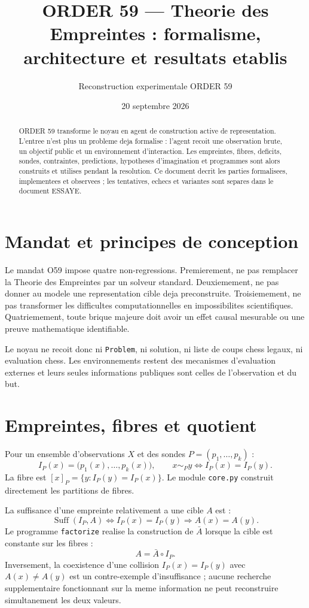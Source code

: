 \documentclass[11pt,a4paper]{article}
\title{ORDER 59 --- Theorie des Empreintes : formalisme, architecture et resultats etablis}
\author{Reconstruction experimentale ORDER 59}
\date{20 septembre 2026}
\begin{document}
\maketitle
\tableofcontents
\newpage

\begin{abstract}
ORDER 59 transforme le noyau en agent de construction active de representation. L'entree n'est plus un probleme deja formalise : l'agent recoit une observation brute, un objectif public et un environnement d'interaction. Les empreintes, fibres, deficits, sondes, contraintes, predictions, hypotheses d'imagination et programmes sont alors construits et utilises pendant la resolution. Ce document decrit les parties formalisees, implementees et observees ; les tentatives, echecs et variantes sont separes dans le document ESSAYE.
\end{abstract}

\section{Mandat et principes de conception}
Le mandat O59 impose quatre non-regressions. Premierement, ne pas remplacer la Theorie des Empreintes par un solveur standard. Deuxiemement, ne pas donner au modele une representation cible deja preconstruite. Troisiemement, ne pas transformer les difficultes computationnelles en impossibilites scientifiques. Quatriemement, toute brique majeure doit avoir un effet causal mesurable ou une preuve mathematique identifiable.

Le noyau ne recoit donc ni \texttt{Problem}, ni solution, ni liste de coups chess legaux, ni evaluation chess. Les environnements restent des mecanismes d'evaluation externes et leurs seules informations publiques sont celles de l'observation et du but.

\section{Empreintes, fibres et quotient}
Pour un ensemble d'observations $X$ et des sondes $P=(p_1,\ldots,p_k)$ :
\[
I_P(x)=\bigl(p_1(x),\ldots,p_k(x)\bigr),\qquad x\sim_P y\iff I_P(x)=I_P(y).
\]
La fibre est $[x]_P=\{y:I_P(y)=I_P(x)\}$. Le module \texttt{core.py} construit directement les partitions de fibres.

La suffisance d'une empreinte relativement a une cible $A$ est :
\[
\operatorname{Suff}(I_P,A)\Longleftrightarrow I_P(x)=I_P(y)\Rightarrow A(x)=A(y).
\]
Le programme \texttt{factorize} realise la construction de $\bar A$ lorsque la cible est constante sur les fibres :
\[
A=\bar A\circ I_P.
\]
Inversement, la coexistence d'une collision $I_P(x)=I_P(y)$ avec $A(x)\neq A(y)$ est un contre-exemple d'insuffisance ; aucune recherche supplementaire fonctionnant sur la meme information ne peut reconstruire simultanement les deux valeurs.
\end{document}
